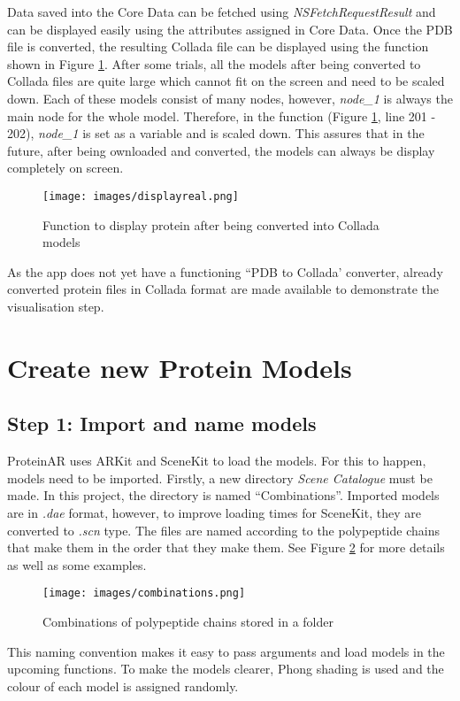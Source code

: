Data saved into the Core Data can be fetched using \emph{NSFetchRequestResult} and can be displayed easily using the attributes assigned in Core Data. Once the PDB file is converted, the resulting Collada file can be displayed using the function shown in Figure \ref{fig:displayreal}. 
After some trials, all the models after being converted to Collada files are quite large which cannot fit on the screen and need to be scaled down. Each of these models consist of many nodes, however, \emph{node\_1} is always the main node for the whole model. Therefore, in the function (Figure \ref{fig:displayreal}, line 201 - 202), \emph{node\_1} is set as a variable and is scaled down. This assures that in the future, after being ownloaded and converted, the models can always be display completely on screen. 
 \begin{figure}[!htp]
	\centering
	\texttt{[image: images/displayreal.png]}
	\caption{Function to display protein after being converted into Collada models}
	\label{fig:displayreal}
\end{figure}

As the app does not yet have a functioning “PDB to Collada' converter, already converted protein files in Collada format are made available to demonstrate the visualisation step.

\section{Create new Protein Models}
\subsection{Step 1: Import and name models}
ProteinAR uses ARKit and SceneKit to load the models. For this to happen, models need to be imported. Firstly, a new directory \emph{Scene Catalogue} must be made. In this project, the directory is named “Combinations”. Imported models are in \emph{.dae} format, however, to improve loading times for SceneKit, they are converted to \emph{.scn} type. The files are named according to the polypeptide chains that make them in the order that they make them. See Figure \ref{fig:combinations} for more details as well as some examples.
 \begin{figure}[!htp]
	\centering
	\texttt{[image: images/combinations.png]}
	\caption{Combinations of polypeptide chains stored in a folder}
	\label{fig:combinations}
\end{figure}
This naming convention makes it easy to pass arguments and load models in the upcoming functions. To make the models clearer, Phong shading is used and the colour of each model is assigned randomly. 

